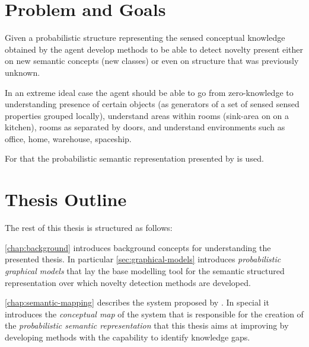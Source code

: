 \section{Problem and Goals}
%
Given a probabilistic structure representing the sensed conceptual knowledge
obtained by the agent develop methods to be able to detect novelty present
either on new semantic concepts (new classes) or even on structure that was
previously unknown.


In an extreme ideal case the agent should be able to go from zero-knowledge to
understanding presence of certain objects (as generators of a set of sensed
sensed properties grouped locally), understand areas within rooms (sink-area on
on a kitchen), rooms as separated by doors, and understand environments such
as office, home, warehouse, spaceship.


For that the probabilistic semantic representation presented by
\cite{andrzej2011phd} is used.

%



\section{Thesis Outline}
The rest of this thesis is structured as follows:

\autoref{chap:background} introduces background concepts for understanding the
presented thesis. In particular \autoref{sec:graphical-models} introduces
\emph{probabilistic graphical models} that lay the base modelling tool for
the semantic structured representation over which novelty detection
methods are developed.

\autoref{chap:semantic-mapping} describes the system proposed by
\cite{andrzej}. In special it introduces the \emph{conceptual map} of the system
that is responsible for the creation of the \emph{probabilistic semantic
representation} that this thesis aims at improving by developing methods with
the capability to identify knowledge gaps.

